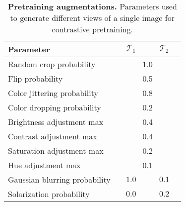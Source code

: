 \begin{table}[ht]
\small
\centering
\caption{\textbf{Pretraining augmentations.} Parameters used to generate different views of a single image for contrastive pretraining.}
\begin{tabular}{l c c }
    Parameter                           & $\hspace{1em} \mathcal{T}_1 \hspace{1em}$ & $\hspace{1em} \mathcal{T}_2 \hspace{1em}$ \\ \hline
    Random crop probability             & \multicolumn{2}{c}{1.0} \\
    Flip probability                    & \multicolumn{2}{c}{0.5} \\
    Color jittering probability         & \multicolumn{2}{c}{0.8} \\
    Color dropping probability          & \multicolumn{2}{c}{0.2} \\
    Brightness adjustment max           & \multicolumn{2}{c}{0.4} \\
    Contrast adjustment max             & \multicolumn{2}{c}{0.4} \\
    Saturation adjustment max           & \multicolumn{2}{c}{0.2} \\
    Hue adjustment max                  & \multicolumn{2}{c}{0.1} \\
    Gaussian blurring probability       & $1.0$ & $0.1$ \\
    Solarization probability            & $0.0$ & $0.2$ \\
\end{tabular}
\label{tab:appendix_pretrain_augmentations}
\end{table}